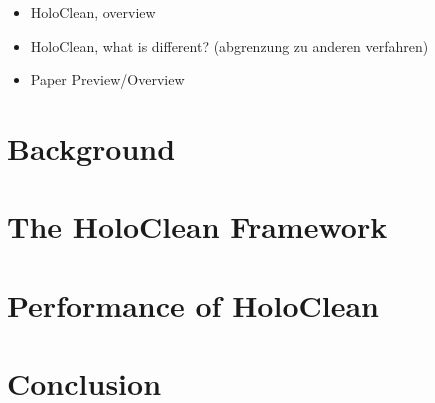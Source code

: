   \begin{itemize}
    \item HoloClean, overview
    \item HoloClean, what is different? (abgrenzung zu anderen verfahren)
    \item Paper Preview/Overview
  \end{itemize}


\section{Background}\label{sec:background}

\section{The HoloClean Framework}\label{sec:framework}

\section{Performance of HoloClean}\label{sec:performance}

\section{Conclusion}\label{sec:conclusion}